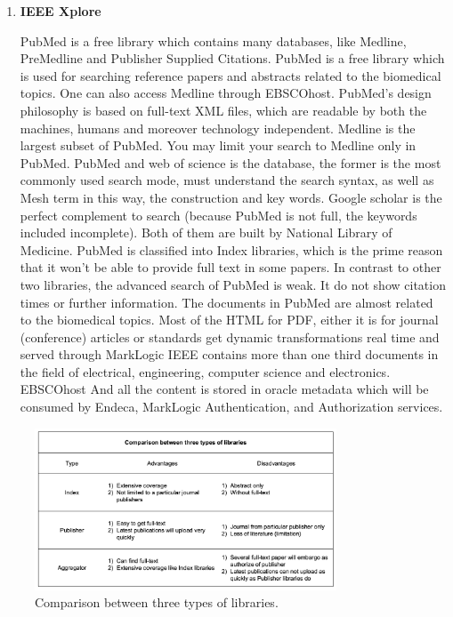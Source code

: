 \begin{enumerate}
	\item\textbf{IEEE Xplore}
	\setlength{\parindent}{1em}
	
	PubMed is a free library which contains many databases, like Medline, PreMedline and Publisher Supplied Citations.
    PubMed is a free library which is used for searching reference papers and abstracts related to the biomedical topics.
    One can also access Medline through EBSCOhost. 
    PubMed’s design philosophy is based on full-text XML files, 
    which are readable by both the machines, humans and moreover technology independent.
    Medline is the largest subset of PubMed. 
    You may limit your search to Medline only in PubMed. 
    PubMed and web of science is the database, the former is the most commonly used search mode, must understand the search syntax, as well as Mesh term in this way,
    the construction and key words. 
    Google scholar is the perfect complement to search (because PubMed is not full, the keywords included incomplete).
    Both of them are built by National Library of Medicine. 
    PubMed is classified into Index libraries, which is the prime reason that it won’t be able to provide full text in some papers.
    In contrast to other two libraries, the advanced search of PubMed is weak. 
    It do not show citation times or further information.
    The documents in PubMed are almost related to the biomedical topics.
    Most of the HTML for PDF, either it is for journal (conference) articles or 
    standards get dynamic transformations real time and served through MarkLogic
    IEEE contains more than one third documents in the field of electrical, engineering, computer science and electronics.
    EBSCOhost
    And all the content is stored in oracle metadata which will be consumed by Endeca, MarkLogic Authentication, and Authorization services.
	
\end{enumerate}


\begin{figure}[htb]
	\begin{center}
		\includegraphics[width=0.8\textwidth]{Wolverine_Background_Chart_1}
	\end{center}
	\caption{Comparison between three types of libraries.\label{WBC1}}
\end{figure}
\newpage
